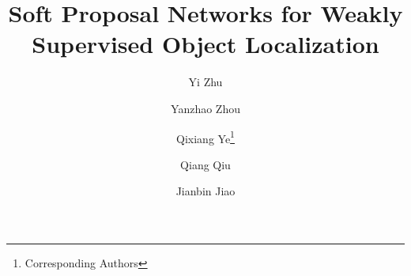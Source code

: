 \documentclass[10pt,twocolumn,letterpaper]{article}
\begin{document}
\makeatletter
\renewcommand*{\@fnsymbol}[1]{\dag}
\makeatother

\title{Soft Proposal Networks for Weakly Supervised Object Localization}

\author[1]{Yi Zhu}
\author[1]{Yanzhao Zhou}
\author[1]{Qixiang Ye\thanks{Corresponding Authors}}
\author[2]{Qiang Qiu}
\author[1]{Jianbin Jiao}


\renewcommand\Authands{ and }


\maketitle














{\small


}
\end{document}
